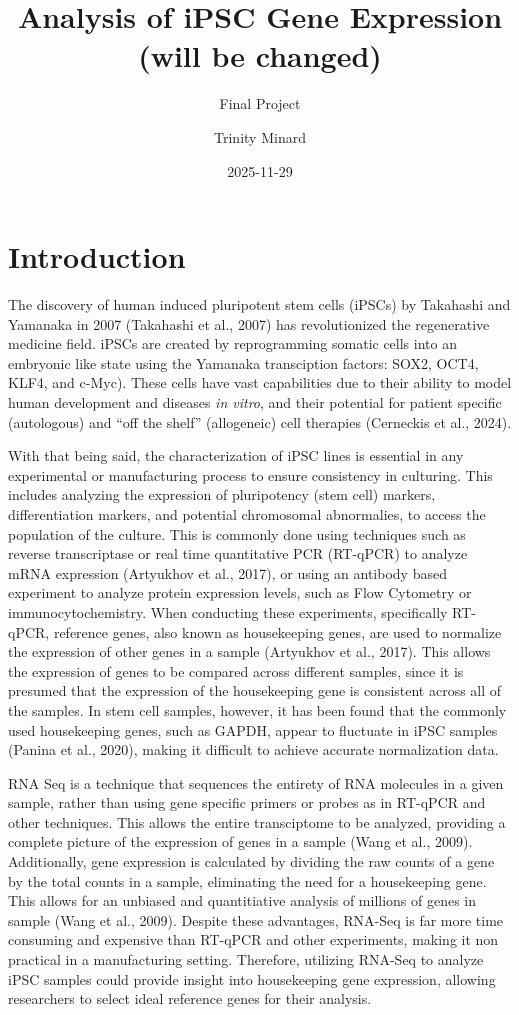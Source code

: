 \documentclass[
  letterpaper,
  DIV=11,
  numbers=noendperiod]{scrartcl}
\title{Analysis of iPSC Gene Expression (will be changed)}
\subtitle{Final Project}
\author{Trinity Minard}
\date{2025-11-29}
\begin{document}
\maketitle


\section{Introduction}\label{introduction}

The discovery of human induced pluripotent stem cells (iPSCs) by
Takahashi and Yamanaka in 2007 (Takahashi et al., 2007) has
revolutionized the regenerative medicine field. iPSCs are created by
reprogramming somatic cells into an embryonic like state using the
Yamanaka transciption factors: SOX2, OCT4, KLF4, and c-Myc). These cells
have vast capabilities due to their ability to model human development
and diseases \emph{in vitro}, and their potential for patient specific
(autologous) and ``off the shelf'' (allogeneic) cell therapies
(Cerneckis et al., 2024).

With that being said, the characterization of iPSC lines is essential in
any experimental or manufacturing process to ensure consistency in
culturing. This includes analyzing the expression of pluripotency (stem
cell) markers, differentiation markers, and potential chromosomal
abnormalies, to access the population of the culture. This is commonly
done using techniques such as reverse transcriptase or real time
quantitative PCR (RT-qPCR) to analyze mRNA expression (Artyukhov et al.,
2017), or using an antibody based experiment to analyze protein
expression levels, such as Flow Cytometry or immunocytochemistry. When
conducting these experiments, specifically RT-qPCR, reference genes,
also known as housekeeping genes, are used to normalize the expression
of other genes in a sample (Artyukhov et al., 2017). This allows the
expression of genes to be compared across different samples, since it is
presumed that the expression of the housekeeping gene is consistent
across all of the samples. In stem cell samples, however, it has been
found that the commonly used housekeeping genes, such as GAPDH, appear
to fluctuate in iPSC samples (Panina et al., 2020), making it difficult
to achieve accurate normalization data.

RNA Seq is a technique that sequences the entirety of RNA molecules in a
given sample, rather than using gene specific primers or probes as in
RT-qPCR and other techniques. This allows the entire transciptome to be
analyzed, providing a complete picture of the expression of genes in a
sample (Wang et al., 2009). Additionally, gene expression is calculated
by dividing the raw counts of a gene by the total counts in a sample,
eliminating the need for a housekeeping gene. This allows for an
unbiased and quantitiative analysis of millions of genes in sample (Wang
et al., 2009). Despite these advantages, RNA-Seq is far more time
consuming and expensive than RT-qPCR and other experiments, making it
non practical in a manufacturing setting. Therefore, utilizing RNA-Seq
to analyze iPSC samples could provide insight into housekeeping gene
expression, allowing researchers to select ideal reference genes for
their analysis.
\end{document}
